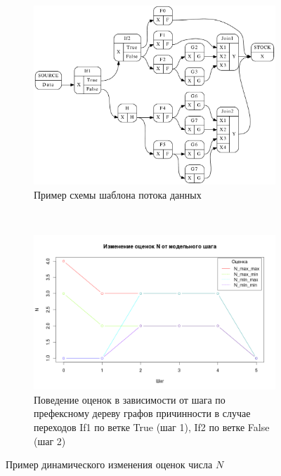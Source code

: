 \documentclass[10pt,a4paper]{article}
\begin{document}
   \begin{figure}[H]
  \centering

  \begin{subfigure}[b]{\textwidth}
    \centering
    \includegraphics[width=\textwidth]{example2.pdf}
    \caption{Пример схемы шаблона потока данных}
    \label{map:connection}
  \end{subfigure}
  ~
  \begin{subfigure}[b]{\textwidth}
    \centering
    \includegraphics[width=\textwidth]{Rplot01}
    \caption{Поведение оценок в зависимости от шага по префексному дереву графов причинности
             в случае переходов If1 по ветке True (шаг 1), If2 по ветке False (шаг 2)}
    \label{map:fa}
  \end{subfigure}
  
  \caption{Пример динамического изменения оценок числа $N$}
  \label{example2}
  \end{figure}
  
\end{document}
